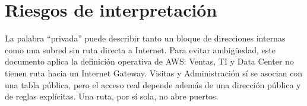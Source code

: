 \section{Riesgos de interpretación}

La palabra ``privada'' puede describir tanto un bloque de direcciones internas como una subred sin ruta directa a Internet. Para evitar ambigüedad, este documento aplica la definición operativa de AWS: Ventas, TI y Data Center no tienen ruta  hacia un Internet Gateway. Visitas y Administración sí se asocian con una tabla pública, pero el acceso real depende además de una dirección pública y de reglas explícitas. Una ruta, por sí sola, no abre puertos.
